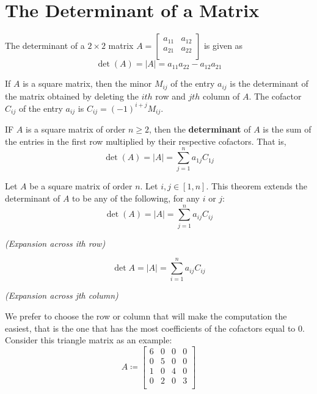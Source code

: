 \section{The Determinant of a Matrix}
\begin{definition}
    The determinant of a \(2\times 2\) matrix \(A=\begin{bmatrix}
        a_{11}  &a_{12}    \\
         a_{21} &a_{22}    \\
    \end{bmatrix}\) is given as
    \[
        \det(A)=|A| = a_{11}a_{22}-a_{12}a_{21}    
    \]
\end{definition}
\begin{definition}
    If \(A\) is a square matrix, then the minor \(M_{ij} \) of the entry \(a_{ij} \) is the determinant of the matrix obtained by deleting the \(ith\) row and \(jth\) column of \(A\). The cofactor \(C_{ij} \) of the entry \(a_{ij} \) is \(C_{ij} =(-1)^{i+j}M_{ij}  \).
\end{definition}
\begin{definition}
    IF \(A\) is a square matrix of order \(n\geq 2\), then the \textbf{determinant} of \(A\) is the sum of the entries in the first row multiplied by their respective cofactors. That is,
    \[
        \det(A)=|A| = \sum_{j=1}^n a_{1j}C_{1j}
    \]
\end{definition}
\begin{theorem}
    Let \(A\) be a square matrix of order \(n\). Let \(i,j\in[1,n]\). This theorem extends the determinant of \(A\) to be any of the following, for any \(i\) or \(j\):
    \[
        \det(A)=|A| = \sum_{j=1}^n a_{ij}C_{ij}   
    \]
    \begin{center}\emph{(Expansion across ith row)}\end{center}
    \[
        \det{A}=|A| = \sum_{i=1}^n a_{ij}C_{ij}   
    \]
    \begin{center}\emph{(Expansion across jth column)}\end{center}
\end{theorem}
We prefer to choose the row or column that will make the computation the easiest, that is the one that has the most coefficients of the cofactors equal to \(0\).\\
Consider this triangle matrix as an example:
\[
    A\coloneqq \begin{bmatrix}
        6 &0  &0  &0   \\
         0&5  &0  &0   \\
         1&0  &4  &0   \\
         0&2  &0  &3   \\
    \end{bmatrix}
\]
